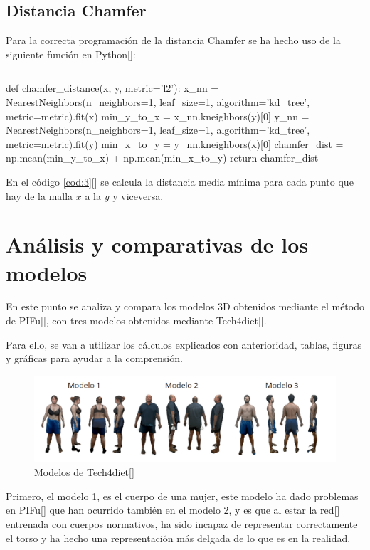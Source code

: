 \clearpage
\subsection{Distancia Chamfer}
Para la correcta programación de la distancia Chamfer se ha hecho uso de la siguiente función en Python[\cite{python}]:

\begin{lstlisting}[caption={Código obtención distancia chamfer}, label=cod:3]
\end{lstlisting}
\begin{python}
	def chamfer_distance(x, y, metric='l2'):
	x_nn = NearestNeighbors(n_neighbors=1, leaf_size=1, algorithm='kd_tree', metric=metric).fit(x)
	min_y_to_x = x_nn.kneighbors(y)[0]
	y_nn = NearestNeighbors(n_neighbors=1, leaf_size=1, algorithm='kd_tree', metric=metric).fit(y)
	min_x_to_y = y_nn.kneighbors(x)[0]
	chamfer_dist = np.mean(min_y_to_x) + np.mean(min_x_to_y)
	return chamfer_dist
\end{python}

En el código \ref{cod:3}[\cite{prokudin_2022}] se calcula la distancia media mínima para cada punto que hay de la malla $x$ a la $y$ y viceversa.

\section{Análisis y comparativas de los modelos}

En este punto se analiza y compara los modelos 3D obtenidos mediante el método de PIFu[\cite{pifu}], con tres modelos obtenidos mediante Tech4diet[\cite{tech}]. 

Para ello, se van a utilizar los cálculos explicados con anterioridad, tablas, figuras y gráficas para ayudar a la comprensión.

\begin{figure}[H]
	\centering
	\includegraphics[scale=0.4]{imagenes/t4d.png}
	\caption{Modelos de Tech4diet[\cite{tech}] }
	\label{fig:t4d}
\end{figure}

Primero, el modelo 1, es el cuerpo de una mujer, este modelo ha dado problemas en PIFu[\cite{pifu}] que han ocurrido también en el modelo 2, y es que al estar la red[\cite{pifu}] entrenada con cuerpos normativos, ha sido incapaz de representar correctamente el torso y ha hecho una representación más delgada de lo que es en la realidad.


